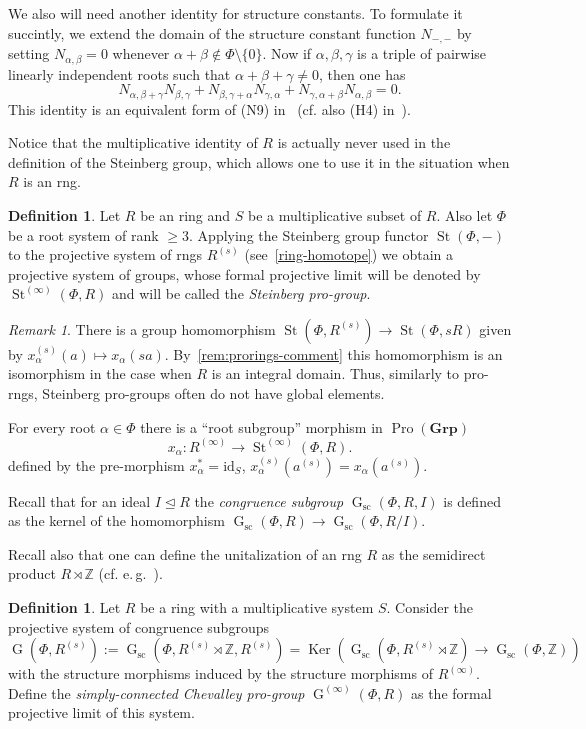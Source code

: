 \documentclass[oneside, 11pt]{amsart}
\numberwithin{equation}{section}
\theoremstyle{definition}
\newtheorem{df}[lemma]{Definition} \Crefname{df}{Definition}{Definitions}
\theoremstyle{remark}
\newtheorem{rem}[lemma]{Remark}
\DeclareMathOperator\St{St}
\DeclareMathOperator\Ker{Ker}
\DeclareMathOperator\GG{G}
\DeclareMathOperator{\Pro}{Pro}
\newcommand{\Group}{\mathbf{Grp}}
\newcommand{\ZZ}{\mathbb{Z}}
\begin{document}
We also will need another identity for structure constants.
To formulate it succintly, we extend the domain of the structure constant function $N_{-,-}$ by setting $N_{\alpha, \beta} = 0$ whenever $\alpha+\beta\not\in\Phi\setminus\{0\}$.
Now if $\alpha, \beta, \gamma$ is a triple of pairwise linearly independent roots such that $\alpha+\beta+\gamma\neq 0$, then one has 
\begin{equation}\label{eq:cocycle2} N_{\alpha,\beta+\gamma} N_{\beta,\gamma} + N_{\beta,\gamma+\alpha} N_{\gamma,\alpha} + N_{\gamma,\alpha+\beta}N_{\alpha,\beta} = 0. \end{equation}
This identity is an equivalent form of (N9) in~\cite[\S~14]{VP} (cf. also (H4) in~\cite{Re75}).

Notice that the multiplicative identity of $R$ is actually never used in the definition of the Steinberg group, 
 which allows one to use it in the situation when $R$ is an rng.
\begin{df}\label{def:Steinberg-homotope}
 Let $R$ be an ring and $S$ be a multiplicative subset of $R$. Also let $\Phi$ be a root system of rank $\geq 3$. Applying the Steinberg group functor $\St(\Phi, -)$ to the projective system of rngs $R^{(s)}$ (see~\cref{ring-homotope}) we obtain a projective system of groups, whose formal projective limit will be denoted by $\St^{(\infty)}(\Phi, R)$ and will be called the {\it Steinberg pro-group}. 
\end{df}

\begin{rem} \label{rem:pro-Steinberg-comment}
There is a group homomorphism $\St(\Phi, R^{(s)}) \to \St(\Phi, sR)$ given by $x_\alpha^{(s)}(a)\mapsto x_\alpha(sa)$. By~\cref{rem:prorings-comment} this homomorphism is an isomorphism in the case when $R$ is an integral domain. Thus, similarly to pro-rngs, Steinberg pro-groups often do not have global elements.
\end{rem}
 
For every root $\alpha \in \Phi$ there is a ``root subgroup'' morphism in $\Pro(\Group)$
\[x_{\alpha} \colon R^{(\infty)} \to \St^{(\infty)}(\Phi, R).\] 
defined by the pre-morphism $x_\alpha^* = \mathrm{id}_S$, $x_\alpha^{(s)}(a^{(s)}) = x_\alpha(a^{(s)})$.

Recall that for an ideal $I \trianglelefteq R$ the {\it congruence subgroup} $\GG_\mathrm{sc}(\Phi, R, I)$ is defined as 
 the kernel of the homomorphism $\GG_\mathrm{sc}(\Phi, R) \to \GG_\mathrm{sc}(\Phi, R/I)$.

Recall also that one can define the unitalization of an rng $R$ as the semidirect product $R \rtimes \ZZ$ (cf. e.\,g.~\cite[Definition~3.2]{Sin}).
 \begin{df}
 Let $R$ be a ring with a multiplicative system $S$.
 Consider the projective system of congruence subgroups 
 \[\GG(\Phi, R^{(s)}) := \GG_{\mathrm{sc}}(\Phi, R^{(s)} \rtimes \ZZ, R^{(s)}) = \Ker\left(\GG_{\mathrm{sc}}(\Phi, R^{(s)} \rtimes \ZZ) \to \GG_{\mathrm{sc}}(\Phi, \ZZ)\right)\] with the structure morphisms induced by the structure morphisms of \(R^{(\infty)}\). Define the {\it simply-connected Chevalley pro-group} $\GG^{(\infty)}(\Phi, R)$ as the formal projective limit of this system.
\end{df}
\end{document}
